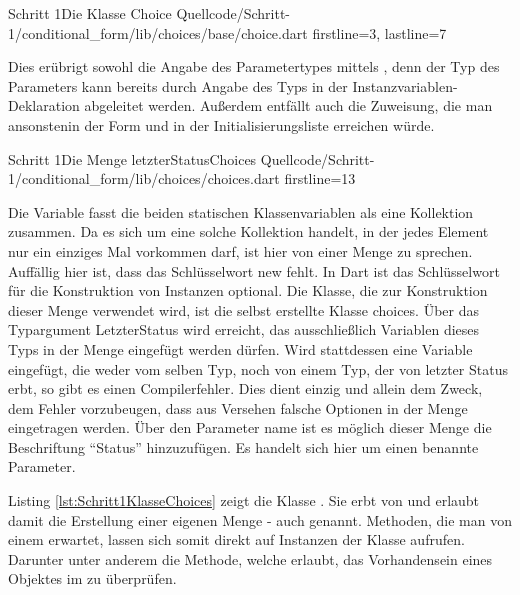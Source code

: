 \begin{alexlisting}{Schritt 1}{Die Klasse Choice}
  {Quellcode/Schritt-1/conditional_form/lib/choices/base/choice.dart}
  {firstline=3, lastline=7}
  \label{lst:Schritt1KlasseChoice}
\end{alexlisting}

Dies erübrigt sowohl die Angabe des Parametertypes mittels , denn der Typ des Parameters kann bereits durch Angabe des Typs in der Instanzvariablen-Deklaration abgeleitet werden. Außerdem entfällt auch die Zuweisung, die man ansonstenin der Form  und  in der Initialisierungsliste erreichen würde.


\begin{alexlisting}{Schritt 1}{Die Menge letzterStatusChoices}
  {Quellcode/Schritt-1/conditional_form/lib/choices/choices.dart}
  {firstline=13}
  \label{lst:Schritt1DieMengeLetzterStatusChoices}
\end{alexlisting}

Die Variable  fasst die beiden statischen Klassenvariablen als eine Kollektion zusammen. Da es sich um eine solche Kollektion handelt, in der jedes Element nur ein einziges Mal vorkommen darf, ist hier von einer Menge zu sprechen. Auffällig hier ist, dass das Schlüsselwort new fehlt. In Dart ist das Schlüsselwort für die Konstruktion von Instanzen optional.  Die Klasse, die zur Konstruktion dieser Menge verwendet wird, ist die selbst erstellte Klasse choices. Über das Typargument LetzterStatus wird erreicht, das ausschließlich Variablen  dieses Typs in der Menge eingefügt werden dürfen. Wird stattdessen eine Variable eingefügt, die weder vom selben Typ, noch von einem Typ, der von letzter Status erbt, so gibt es einen Compilerfehler. Dies dient einzig und allein dem Zweck, dem  Fehler vorzubeugen, dass aus Versehen falsche Optionen in der Menge eingetragen werden. Über den Parameter name ist es möglich dieser Menge die Beschriftung “Status” hinzuzufügen.  Es handelt sich hier um einen  benannte Parameter.

Listing \ref{lst:Schritt1KlasseChoices} zeigt die Klasse . Sie erbt von  und erlaubt damit die Erstellung  einer eigenen Menge - auch  genannt. Methoden, die man von einem  erwartet,  lassen sich somit direkt auf  Instanzen der Klasse  aufrufen. Darunter unter anderem die  Methode,  welche erlaubt, das Vorhandensein eines Objektes im  zu überprüfen.

